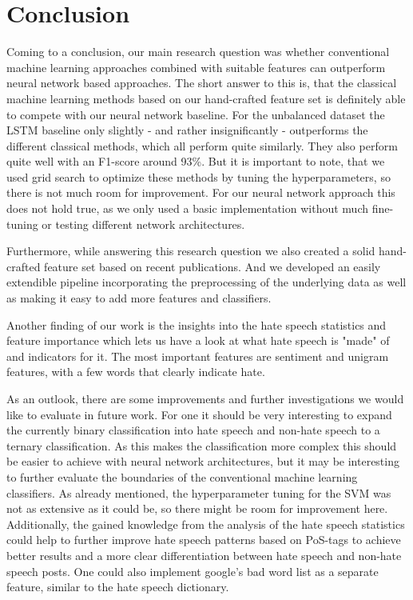 \section{Conclusion} \label{conclusion}

Coming to a conclusion, our main research question was whether conventional machine learning approaches combined with suitable features can outperform neural network based approaches. The short answer to this is, that the classical machine learning methods based on our hand-crafted feature set is definitely able to compete with our neural network baseline. For the unbalanced dataset the LSTM baseline only slightly - and rather insignificantly - outperforms the different classical methods, which all perform quite similarly. They also perform quite well with an F1-score around 93\%. But it is important to note, that we used grid search to optimize these methods by tuning the hyperparameters, so there is not much room for improvement. For our neural network approach this does not hold true, as we only used a basic implementation without much fine-tuning or testing different network architectures.

Furthermore, while answering this research question we also created a solid hand-crafted feature set based on recent publications. And we developed an easily extendible pipeline incorporating the preprocessing of the underlying data as well as making it easy to add more features and classifiers.

Another finding of our work is the insights into the hate speech statistics and feature importance which lets us have a look at what hate speech is "made" of and indicators for it. The most important features are sentiment and unigram features, with a few words that clearly indicate hate.

\vspace{0.5cm}

As an outlook, there are some improvements and further investigations we would like to evaluate in future work. For one it should be very interesting to expand the currently binary classification into hate speech and non-hate speech to a ternary classification. As this makes the classification more complex this should be easier to achieve with neural network architectures, but it may be interesting to further evaluate the boundaries of the conventional machine learning classifiers.
As already mentioned, the hyperparameter tuning for the SVM was not as extensive as it could be, so there might be room for improvement here.
Additionally, the gained knowledge from the analysis of the hate speech statistics could help to further improve hate speech patterns based on PoS-tags to achieve better results and a more clear differentiation between hate speech and non-hate speech posts.
One could also implement google's bad word list as a separate feature, similar to the hate speech dictionary.
